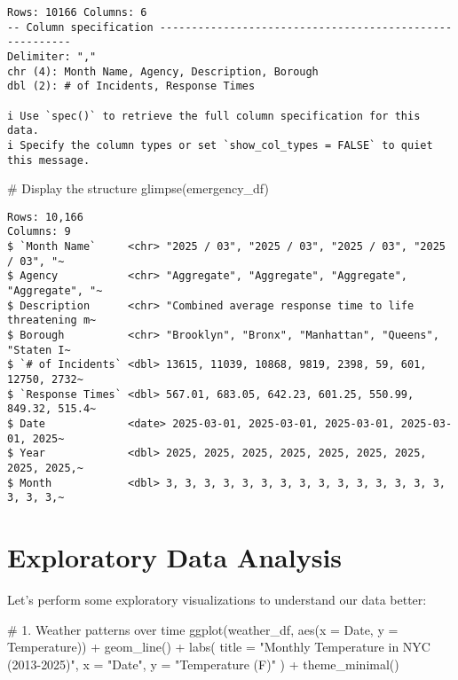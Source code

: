 \documentclass[
  letterpaper,
  DIV=11,
  numbers=noendperiod]{scrreprt}
\newenvironment{Shaded}{\begin{snugshade}}{\end{snugshade}}
\newcommand{\AttributeTok}[1]{\textcolor[rgb]{0.40,0.45,0.13}{#1}}
\newcommand{\CommentTok}[1]{\textcolor[rgb]{0.37,0.37,0.37}{#1}}
\newcommand{\FunctionTok}[1]{\textcolor[rgb]{0.28,0.35,0.67}{#1}}
\newcommand{\NormalTok}[1]{\textcolor[rgb]{0.00,0.23,0.31}{#1}}
\newcommand{\SpecialCharTok}[1]{\textcolor[rgb]{0.37,0.37,0.37}{#1}}
\newcommand{\StringTok}[1]{\textcolor[rgb]{0.13,0.47,0.30}{#1}}
\begin{document}
\begin{verbatim}
Rows: 10166 Columns: 6
-- Column specification --------------------------------------------------------
Delimiter: ","
chr (4): Month Name, Agency, Description, Borough
dbl (2): # of Incidents, Response Times

i Use `spec()` to retrieve the full column specification for this data.
i Specify the column types or set `show_col_types = FALSE` to quiet this message.
\end{verbatim}

\begin{Shaded}
\begin{Highlighting}[]
\CommentTok{\# Display the structure}
\FunctionTok{glimpse}\NormalTok{(emergency\_df)}
\end{Highlighting}
\end{Shaded}

\begin{verbatim}
Rows: 10,166
Columns: 9
$ `Month Name`     <chr> "2025 / 03", "2025 / 03", "2025 / 03", "2025 / 03", "~
$ Agency           <chr> "Aggregate", "Aggregate", "Aggregate", "Aggregate", "~
$ Description      <chr> "Combined average response time to life threatening m~
$ Borough          <chr> "Brooklyn", "Bronx", "Manhattan", "Queens", "Staten I~
$ `# of Incidents` <dbl> 13615, 11039, 10868, 9819, 2398, 59, 601, 12750, 2732~
$ `Response Times` <dbl> 567.01, 683.05, 642.23, 601.25, 550.99, 849.32, 515.4~
$ Date             <date> 2025-03-01, 2025-03-01, 2025-03-01, 2025-03-01, 2025~
$ Year             <dbl> 2025, 2025, 2025, 2025, 2025, 2025, 2025, 2025, 2025,~
$ Month            <dbl> 3, 3, 3, 3, 3, 3, 3, 3, 3, 3, 3, 3, 3, 3, 3, 3, 3, 3,~
\end{verbatim}

\section{Exploratory Data Analysis}\label{exploratory-data-analysis}

Let's perform some exploratory visualizations to understand our data
better:

\begin{Shaded}
\begin{Highlighting}[]
\CommentTok{\# 1. Weather patterns over time}
\FunctionTok{ggplot}\NormalTok{(weather\_df, }\FunctionTok{aes}\NormalTok{(}\AttributeTok{x =}\NormalTok{ Date, }\AttributeTok{y =}\NormalTok{ Temperature)) }\SpecialCharTok{+}
  \FunctionTok{geom\_line}\NormalTok{() }\SpecialCharTok{+}
  \FunctionTok{labs}\NormalTok{(}
    \AttributeTok{title =} \StringTok{"Monthly Temperature in NYC (2013{-}2025)"}\NormalTok{,}
    \AttributeTok{x =} \StringTok{"Date"}\NormalTok{,}
    \AttributeTok{y =} \StringTok{"Temperature (F)"}
\NormalTok{  ) }\SpecialCharTok{+}
  \FunctionTok{theme\_minimal}\NormalTok{()}
\end{Highlighting}
\end{Shaded}
\end{document}
